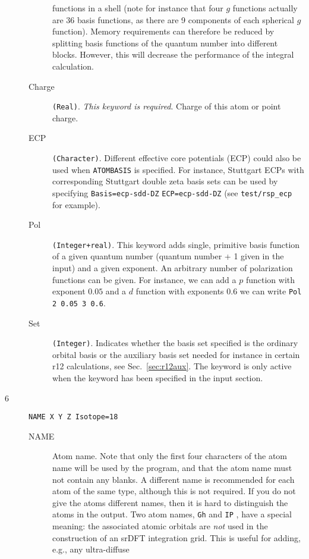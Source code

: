 \begin{description}
\begin{description}
functions in a shell (note for instance that four $g$ functions
actually are 36 basis functions,
as there are 9 components of each spherical $g$ function).
Memory requirements can therefore be reduced by splitting
basis functions of the quantum number into different blocks. However,
this will decrease the performance of the
integral calculation.
\item[Charge] \verb|(Real)|. {\em This keyword is required\/}.
  Charge of this atom or point charge. 
\item[ECP] \verb|(Character)|.
  Different effective core potentials (ECP) could also be used when \verb|ATOMBASIS|
  is specified. For instance, Stuttgart ECPs with corresponding
  Stuttgart double zeta basis sets can be used by specifying
  \verb|Basis=ecp-sdd-DZ| \verb|ECP=ecp-sdd-DZ| (see \verb|test/rsp_ecp| for example).
\item[Pol] \verb|(Integer+real)|. This keyword adds single, primitive
  basis function of a given quantum number (quantum number + 1 given
  in the input) and a given exponent. An arbitrary number of
  polarization functions can be given. For instance, we can add a $p$
  function with exponent $0.05$ and a $d$ function with exponents
  $0.6$ we can write \verb|Pol 2 0.05 3 0.6|.
\item[Set] \verb|(Integer)|. Indicates whether the basis set specified
  is the ordinary orbital basis or the auxiliary basis set needed for
  instance in certain r12 calculations, see
  Sec.~\ref{sec:r12aux}. The keyword is only active when the keyword
   has been specified in the  input section.
\end{description}
\item[6] \verb|NAME X Y Z Isotope=18|
\begin{description}
\item[NAME] Atom name.
Note that only the first four characters of the atom name will be used by the program,
and that the atom name must not contain any blanks.
A different name is recommended for each atom of the same type, although this is not required.
If you do not give the atoms different names, then it is hard to distinguish the atoms in
the output.
Two atom names, \verb|Gh| and \verb|IP| , have a special meaning: the associated
atomic orbitals are \emph{not} used in the construction of
an srDFT integration grid. This is useful for adding, e.g., any ultra-diffuse

\end{description}
\end{description}
